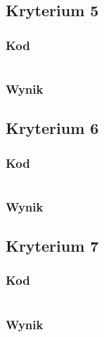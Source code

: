 \documentclass{article}
\begin{document}
\subsection{Kryterium 5}
\subsubsection{Kod}
\begin{lstlisting}
\end{lstlisting}

\subsubsection{Wynik}

\subsection{Kryterium 6}
\subsubsection{Kod}
\begin{lstlisting}
\end{lstlisting}

\subsubsection{Wynik}

\subsection{Kryterium 7}
\subsubsection{Kod}
\begin{lstlisting}
\end{lstlisting}

\subsubsection{Wynik}

\end{document}
